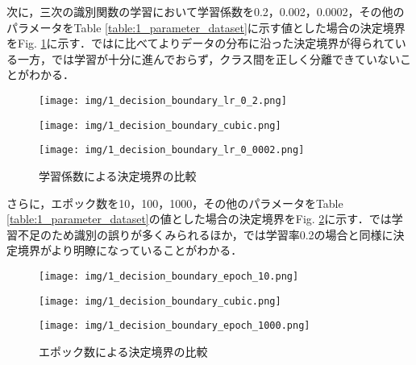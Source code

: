 \documentclass[a4paper,12pt]{jsarticle}
\renewcommand{\figurename}{Fig. }
\renewcommand{\tablename}{Table }
\begin{document}
次に，三次の識別関数の学習において学習係数を0.2，0.002，0.0002，その他のパラメータを\tablename\ref{table:1_parameter_dataset}に示す値とした場合の決定境界を\figurename\ref{fig:1_decision_boundary_learning_rate}に示す．ではに比べてよりデータの分布に沿った決定境界が得られている一方，では学習が十分に進んでおらず，クラス間を正しく分離できていないことがわかる．

\begin{figure}[htbp]
  \centering
  \begin{minipage}[b]{0.25\linewidth}
    \centering
    \texttt{[image: img/1\_decision\_boundary\_lr\_0\_2.png]}
    \label{fig:1_decision_boundary_lr_0_2}
  \end{minipage}
  \begin{minipage}[b]{0.25\linewidth}
    \centering
    \texttt{[image: img/1\_decision\_boundary\_cubic.png]}
    \label{fig:1_decision_boundary_lr_0_002}
  \end{minipage}
  \begin{minipage}[b]{0.25\linewidth}
    \centering
    \texttt{[image: img/1\_decision\_boundary\_lr\_0\_0002.png]}
    \label{fig:1_decision_boundary_lr_0_0002}
  \end{minipage}
  \caption{学習係数による決定境界の比較}
  \label{fig:1_decision_boundary_learning_rate}
\end{figure}

さらに，エポック数を10，100，1000，その他のパラメータを\tablename\ref{table:1_parameter_dataset}の値とした場合の決定境界を\figurename\ref{fig:1_decision_boundary_epoch}に示す．では学習不足のため識別の誤りが多くみられるほか，では学習率0.2の場合と同様に決定境界がより明瞭になっていることがわかる．

\begin{figure}[htbp]
  \centering
  \begin{minipage}[b]{0.25\linewidth}
    \centering
    \texttt{[image: img/1\_decision\_boundary\_epoch\_10.png]}
    \label{fig:1_decision_boundary_epoch_10}
  \end{minipage}
  \begin{minipage}[b]{0.25\linewidth}
    \centering
    \texttt{[image: img/1\_decision\_boundary\_cubic.png]}
    \label{fig:1_decision_boundary_epoch_100}
  \end{minipage}
  \begin{minipage}[b]{0.25\linewidth}
    \centering
    \texttt{[image: img/1\_decision\_boundary\_epoch\_1000.png]}
    \label{fig:1_decision_boundary_epoch_1000}
  \end{minipage}
  \caption{エポック数による決定境界の比較}
  \label{fig:1_decision_boundary_epoch}
\end{figure}
\end{document}
